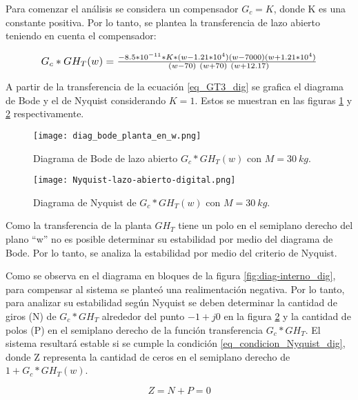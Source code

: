 Para comenzar el análisis se considera un compensador $G_c=K$, donde K es una constante positiva. Por lo tanto, se plantea la transferencia de lazo abierto teniendo en cuenta el compensador:
 
 \begin{equation} \label{eq_GT3_dig}
 		\resizebox{.85\hsize}{!}
 	{
 	$G_c*GH_T(w)=\frac{-8.5*10^{-11}*K*(w-1.21*10^4)(w-7000)(w+1.21*10^4)}{\ (w-70)\ (w+70)\ (w+12.17)}$ 
 }
 \end{equation}


 A partir de la transferencia de la ecuación  \ref{eq_GT3_dig} se  grafica el diagrama de Bode y el de Nyquist considerando $K=1$. Estos se muestran en las figuras \ref{fig:bode_digital} y \ref{fig:nyquist-lazo-abierto-digital} respectivamente.

\begin{figure}[H]
	\centering
	\texttt{[image: diag\_bode\_planta\_en\_w.png]}
	\caption{Diagrama de Bode de lazo abierto $G_c*GH_{T}(w)$ con $M=30\:kg$.}
	\label{fig:bode_digital}
\end{figure}

\begin{figure}[H]
	\centering
	\texttt{[image: Nyquist-lazo-abierto-digital.png]}
	\caption{Diagrama de Nyquist de $G_c*GH_{T}(w)$ con $M=30\:kg$.}
	\label{fig:nyquist-lazo-abierto-digital}
\end{figure}

Como la transferencia de la planta $GH_T$ tiene un polo en el semiplano derecho del plano ``w'' no es posible determinar su estabilidad por medio del diagrama de Bode. Por lo tanto, se analiza la estabilidad por medio del criterio de Nyquist.

Como se observa en el diagrama en bloques de la figura \ref{fig:diag-interno_dig}, para compensar al sistema se planteó una realimentación negativa. Por lo tanto, para analizar su estabilidad según Nyquist se deben determinar la cantidad de giros (N) de $G_c*GH_T$ alrededor del punto $-1+j0$ en la figura \ref{fig:nyquist-lazo-abierto-digital} y la cantidad de polos (P) en el semiplano derecho de la función transferencia $G_c*GH_T$. El sistema resultará estable si se cumple la condición \ref{eq_condicion_Nyquist_dig}, donde Z representa la cantidad de ceros en el semiplano derecho de $1+G_c*GH_T(w)$.

\begin{equation}\label{eq_condicion_Nyquist_dig}
	Z=N+P=0
\end{equation}


